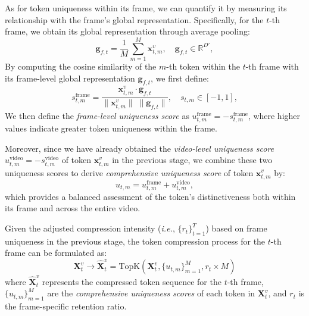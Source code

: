 As for token uniqueness within its frame, we can quantify it by measuring its relationship with the frame's global representation. Specifically, for the $t$-th frame, we obtain its global representation through average pooling:
{\setlength\abovedisplayskip{2mm}
\setlength\belowdisplayskip{2mm}
\begin{equation}
\mathbf{g}_{f,t} = \frac{1}{M} \sum_{m=1}^{M} \mathbf{x}_{t,m}^v,\quad \mathbf{g}_{f,t}\in\mathbb{R}^{D'},
\end{equation}}
By computing the cosine similarity of the $m$-th token within the $t$-th frame with its frame-level global representation $\mathbf{g}_{f,t}$, we first define:
{\setlength\abovedisplayskip{2mm}
\setlength\belowdisplayskip{2mm}
\begin{equation}
s^\mathrm{frame}_{t,m} = \frac{\mathbf{x}_{t,m}^v \cdot \mathbf{g}_{f,t}}{\|\mathbf{x}_{t,m}^v\|\;\|\mathbf{g}_{f,t}\|},\quad s_{t,m}\in[-1,1],
\end{equation}}
We then define the \emph{frame-level uniqueness score} as $u^\mathrm{frame}_{t,m} = - s^\mathrm{frame}_{t,m}$, where higher values indicate greater token uniqueness within the frame.



Moreover, since we have already obtained the \emph{video-level uniqueness score} $u^\mathrm{video}_{t,m} = -s^\mathrm{video}_{t,m}$ of token $\mathbf{x}_{t,m}^v$ in the previous stage, we combine these two uniqueness scores to derive \emph{comprehensive uniqueness score} of token $\mathbf{x}_{t,m}^v$ by:
{\setlength\abovedisplayskip{2mm}
\setlength\belowdisplayskip{2mm}
\begin{equation}
u_{t,m} = u^\mathrm{frame}_{t,m} + u^\mathrm{video}_{t,m},
\end{equation}}
which provides a balanced assessment of the token's distinctiveness both within its frame and across the entire video.

Given the adjusted compression intensity (\textit{i.e.}, $\{r_t\}_{t=1}^T$) based on frame uniqueness in the previous stage, the token compression process for the $t$-th frame can be formulated as:
{\setlength\abovedisplayskip{2mm}
\setlength\belowdisplayskip{2mm}
\begin{equation}
    \mathbf{X}_{t}^{v} \rightarrow \mathbf{\hat{X}}_{t}^{v} = \text{TopK}(\mathbf{X}_{t}^{v}, \{u_{t,m}\}_{m=1}^{M}, r_t \times M)
\end{equation}
}
where $\mathbf{\hat{X}}_{t}^{v}$ represents the compressed token sequence for the $t$-th frame, $\{u_{t,m}\}_{m=1}^{M}$ are the \emph{comprehensive uniqueness scores} of each token in $\mathbf{X}_{t}^{v}$, and $r_t$ is the frame-specific retention ratio. 

